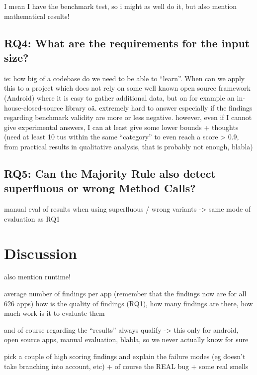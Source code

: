 I mean I have the benchmark test, so i might as well do it, but also mention mathematical results!

\subsection{RQ4: What are the requirements for the input size?}

ie: how big of a codebase do we need to be able to ``learn''. When can we apply this to a project which does not rely on some well known open source framework (Android) where it is easy to gather additional data, but on for example an in-house-closed-source library oä.
extremely hard to answer especially if the findings regarding benchmark validity are more or less negative.
however, even if I cannot give experimental answers, I can at least give some lower bounds + thoughts
(need at least 10 tus within the same ``category'' to even reach a score > 0.9, from practical results in qualitative analysis, that is probably not enough, blabla)



\subsection{RQ5: Can the Majority Rule also detect superfluous or wrong Method Calls?}

manual eval of results when using superfluous / wrong variants
-> same mode of evaluation as RQ1

\section{Discussion}

also mention runtime!

average number of findings per app (remember that the findings now are for all 626 apps)
how is the quality of findings (RQ1), how many findings are there, how much work is it to evaluate them

and of course regarding the ``results'' always qualify -> this only for android, open source apps, manual evaluation, blabla, so we never actually know for sure

pick a couple of high scoring findings and explain the failure modes (eg doesn't take branching into account, etc)
+ of course the REAL bug + some real smells

